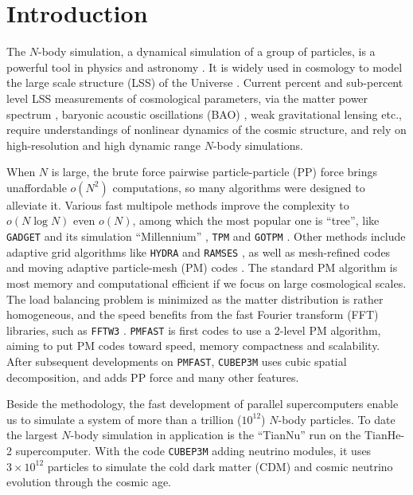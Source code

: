 \documentclass[10pt,twocolumn,preprint]{emulateapj}
\begin{document}
\section{Introduction}\label{s.intro}
The $N$-body simulation, a dynamical simulation of a group of particles, is a powerful tool in physics and astronomy \citep{1988csup.book.....H}. It is widely used in cosmology to model the large scale structure (LSS) of the Universe \citep{1985ApJ...292..371D}. Current percent and sub-percent level LSS measurements of cosmological parameters, via the matter power spectrum \citep{2005MNRAS.360L..82R,2011ApJ...726....7T}, baryonic acoustic oscillations (BAO) \citep{2005ApJ...633..560E,2009ApJ...700..479T}, weak gravitational lensing \citep{2003ApJ...592..699V,2009A&A...499...31H,2009ApJ...701..945S} etc., require understandings of nonlinear dynamics of the cosmic structure, and rely on high-resolution and high dynamic range $N$-body simulations.

When $N$ is large, the brute force pairwise particle-particle (PP) force brings unaffordable $o(N^2)$ computations, so many algorithms were designed to alleviate it. Various fast multipole methods \citep{1985JCoPh..60..187R} improve the complexity to $o(N\log N)$ even $o(N)$, among which the most popular one is ``tree'', like {\tt GADGET} \citep{2001NewA....6...79S,2005MNRAS.364.1105S} and its simulation ``Millennium'' \citep{2005Natur.435..629S,2012MNRAS.426.2046A}, {\tt TPM} \citep{1995ApJS...98..355X} and {\tt GOTPM} \citep{2004NewA....9..111D}. Other methods include adaptive grid algorithms like {\tt HYDRA} \citep{1995ApJ...452..797C} and {\tt RAMSES} \citep{2010ascl.soft11007T}, as well as mesh-refined codes \citep{1991ApJ...368L..23C} and moving adaptive particle-mesh (PM) codes \citep{1995ApJS..100..269P}. The standard PM algorithm \citep{1988csup.book.....H} is most memory and computational efficient if we focus on large cosmological scales. The load balancing problem is minimized as the matter distribution is rather homogeneous, and the speed benefits from the fast Fourier transform (FFT) libraries, such as {\tt FFTW3} \citep{Frigo05thedesign}. {\tt PMFAST} \citep{2005NewA...10..393M} is first codes to use a 2-level PM algorithm, aiming to put PM codes toward speed, memory compactness and scalability. After subsequent developments on {\tt PMFAST}, {\tt CUBEP3M} \citep{2013MNRAS.436..540H} uses cubic spatial decomposition, and adds PP force and many other features.

Beside the methodology, the fast development of parallel supercomputers enable us to simulate a system of more than a trillion ($10^{12}$) $N$-body particles. To date the largest $N$-body simulation in application is the ``TianNu'' \citep{2017NatAs...1E.143Y,2017RAA....17...85E} run on the TianHe-2 supercomputer. With the code {\tt CUBEP3M} adding neutrino modules, it uses $3\times 10^{12}$ particles to simulate the cold dark matter (CDM) and cosmic neutrino evolution through the cosmic age.
\end{document}
